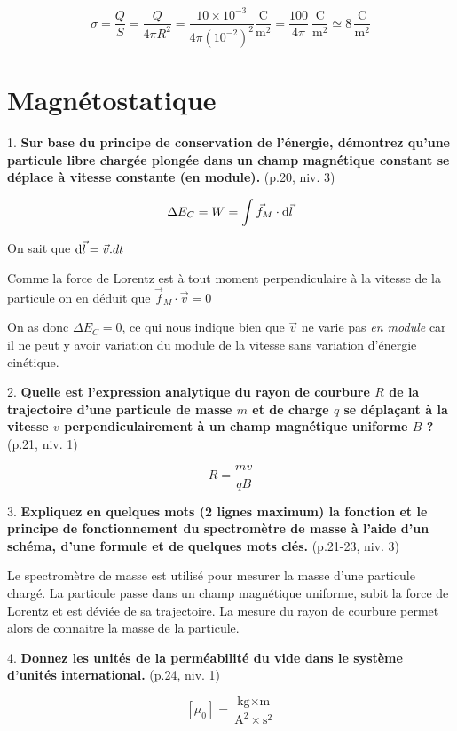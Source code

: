 \documentclass	[11pt, a4paper, openany]{book}
\begin{document}
		$$ \sigma = \dfrac{Q}{S} = \dfrac{Q}{4\pi R^2} = \dfrac{10\times 10^{-3}}{4\pi (10^{-2})^2} \dfrac{\mathrm{C}}{\mathrm{m}^2} = \dfrac{100}{4\pi}\ \dfrac{\mathrm{C}}{\mathrm{m}^2} \simeq 8\,\dfrac{\mathrm{C}}{\mathrm{m}^2}$$
		
		\vspace{0,5cm}
				
				
		\newpage
		\renewcommand{\quest}[4]{#1. \textbf{#4} (p.#2, niv. #3)}
		\section{Magnétostatique}
		
		\quest{1}{20}{3}{Sur base du principe de conservation de l’énergie, démontrez qu’une particule libre chargée plongée dans un champ magnétique constant se déplace à vitesse constante (en module).}
		
		$$\Delta E_C = W = \int \vec f_M \cdot {\rm d}\vec l$$
		
		On sait que ${\rm d}\vec l = \vec v . dt$
		
		Comme la force de Lorentz est à tout moment perpendiculaire à la vitesse de la particule on en déduit que $\vec f_M \cdot \vec v = 0$
		
		On as donc $\Delta E_C = 0$, ce qui nous indique bien que $\vec v$ ne varie pas \emph{en module} car il ne peut y avoir variation du module de la vitesse sans variation d'énergie cinétique.
		
		\quest{2}{21}{1}{Quelle est l’expression analytique du rayon de courbure $R$ de la trajectoire d’une particule de masse $m$ et de charge $q$ se déplaçant à la vitesse $v$ perpendiculairement à un champ magnétique uniforme $B$ ?}
		
		$$ R = \dfrac{mv}{qB}$$
		
		\quest{3}{21-23}{3}{Expliquez en quelques mots (2 lignes maximum) la fonction et le principe de fonctionnement du spectromètre de masse à l’aide d’un schéma, d’une formule et de quelques mots clés.}
		
		Le spectromètre de masse est utilisé pour mesurer la masse d'une particule chargé. La particule passe dans un champ magnétique uniforme, subit la force de Lorentz et est déviée de sa trajectoire. La mesure du rayon de courbure permet alors de connaitre la masse de la particule.
		
		\quest{4}{24}{1}{Donnez les unités de la perméabilité du vide dans le système d’unités international.}
		
		$$ [\mu_0] = \dfrac{\text{kg}\times \text{m}}{\text{A}^2\times \text{s}^2}  $$
		
\end{document}
